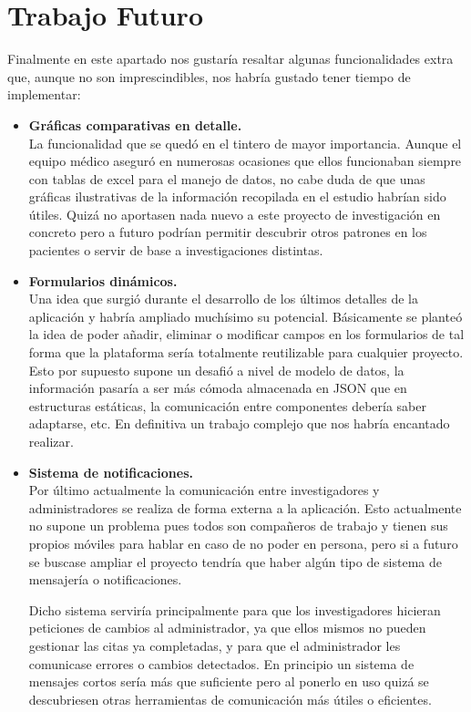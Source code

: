 \chapter{Trabajo Futuro}
 Finalmente en este apartado nos gustaría resaltar algunas funcionalidades extra que, aunque no son imprescindibles, nos habría gustado tener tiempo de implementar:
 \newline
 
 \begin{itemize}
  \item\textbf{Gráficas comparativas en detalle.} \\
  La funcionalidad que se quedó en el tintero de mayor importancia. Aunque el equipo médico aseguró en numerosas ocasiones que ellos funcionaban siempre con tablas de excel para el manejo de datos, no cabe duda de que unas gráficas ilustrativas de la información recopilada en el estudio habrían sido útiles. Quizá no aportasen nada nuevo a este proyecto de investigación en concreto pero a futuro podrían permitir descubrir otros patrones en los pacientes o servir de base a investigaciones distintas. \\
  
  \item\textbf{Formularios dinámicos.} \\
  Una idea que surgió durante el desarrollo de los últimos detalles de la aplicación y habría ampliado muchísimo su potencial. Básicamente se planteó la idea de poder añadir, eliminar o modificar campos en los formularios de tal forma que la plataforma sería totalmente reutilizable para cualquier proyecto. Esto por supuesto supone un desafió a nivel de modelo de datos, la información pasaría a ser más cómoda almacenada en JSON que en estructuras estáticas, la comunicación entre componentes debería saber adaptarse, etc. En definitiva un trabajo complejo que nos habría encantado realizar. \\
  
  \item\textbf{Sistema de notificaciones.} \\
  Por último actualmente la comunicación entre investigadores y administradores se realiza de forma externa a la aplicación. Esto actualmente no supone un problema pues todos son compañeros de trabajo y tienen sus propios móviles para hablar en caso de no poder en persona, pero si a futuro se buscase ampliar el proyecto tendría que haber algún tipo de sistema de mensajería o notificaciones. 
  \newline
  
  Dicho sistema serviría principalmente para que los investigadores hicieran peticiones de cambios al administrador, ya que ellos mismos no pueden gestionar las citas ya completadas, y para que el administrador les comunicase errores o cambios detectados. En principio un sistema de mensajes cortos sería más que suficiente pero al ponerlo en uso quizá se descubriesen otras herramientas de comunicación más útiles o eficientes. \\

\end{itemize}